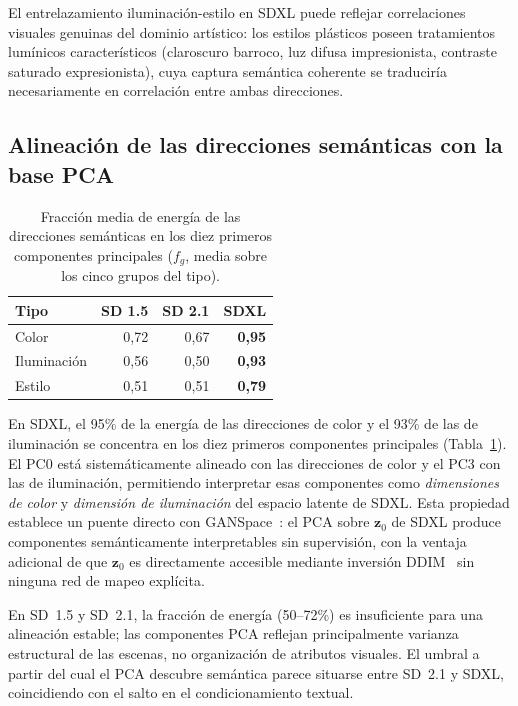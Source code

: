 \documentclass[12pt, a4paper, twoside]{book}
\newcommand{\z}{\mathbf{z}}
\begin{document}
El entrelazamiento iluminación-estilo en SDXL puede reflejar correlaciones visuales genuinas
del dominio artístico: los estilos plásticos poseen tratamientos lumínicos característicos
(claroscuro barroco, luz difusa impresionista, contraste saturado expresionista), cuya
captura semántica coherente se traduciría necesariamente en correlación entre ambas
direcciones.

\subsection{Alineación de las direcciones semánticas con la base PCA}
\label{subsec:res:energia_pca}

\begin{table}[htb]
\centering
\caption{Fracción media de energía de las direcciones semánticas en los diez primeros
componentes principales ($f_g$, media sobre los cinco grupos del tipo).}
\label{tab:energia_pca}
\small
\begin{tabular}{lrrr}
\toprule
\textbf{Tipo} & \textbf{SD 1.5} & \textbf{SD 2.1} & \textbf{SDXL} \\
\midrule
Color       & 0,72 & 0,67 & \textbf{0,95} \\
Iluminación & 0,56 & 0,50 & \textbf{0,93} \\
Estilo      & 0,51 & 0,51 & \textbf{0,79} \\
\bottomrule
\end{tabular}
\end{table}

En SDXL, el 95\% de la energía de las direcciones de color y el 93\% de las de iluminación
se concentra en los diez primeros componentes principales (Tabla~\ref{tab:energia_pca}).
El PC0 está sistemáticamente alineado con las direcciones de color y el PC3 con las de
iluminación, permitiendo interpretar esas componentes como \textit{dimensiones de color} y
\textit{dimensión de iluminación} del espacio latente de SDXL. Esta propiedad establece
un puente directo con GANSpace~\citep{harkonen2020ganspace}: el PCA sobre $\z_0$ de SDXL
produce componentes semánticamente interpretables sin supervisión, con la ventaja adicional
de que $\z_0$ es directamente accesible mediante inversión DDIM~\citep{song2021ddim} sin
ninguna red de mapeo explícita.

En SD~1.5 y SD~2.1, la fracción de energía (50--72\%) es insuficiente para una alineación
estable; las componentes PCA reflejan principalmente varianza estructural de las escenas,
no organización de atributos visuales. El umbral a partir del cual el PCA descubre semántica
parece situarse entre SD~2.1 y SDXL, coincidiendo con el salto en el condicionamiento textual.
\end{document}
